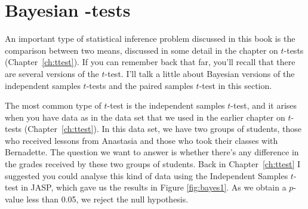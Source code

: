 \begin{comment}
Finally, if we turn to hypergeometric sampling in which everything is fixed, we get...
\begin{rblock1}
> @usr{contingencyTableBF(crosstab, sampleType = "hypergeom")}
Error in contingencyHypergeometric(as.matrix(data2), a) : 
  hypergeometric contingency tables restricted to 2 x 2 tables; see help for contingencyTableBF()
\end{rblock1}
... an error message. Okay, some quick reading through the help files hints that support for larger contingency tables is coming, but it's not been implemented yet. In the meantime, let's imagine we have data from the ``toy labelling'' experiment I described earlier in this section. Specifically, let's say our data look like this:
\begin{rblock1}
> @usr{toys}
     pink blue
girl    8    2
boy     2    8
\end{rblock1}
The Bayesian test with hypergeometric sampling gives us this:
\begin{rblock1}
> @usr{contingencyTableBF(toys, sampleType = "hypergeom")}
Bayes factor analysis
--------------
[1] Non-indep. (a=1) : 8.294321 @plusorminus0%

Against denominator:
  Null, independence, a = 1 
---
Bayes factor type: BFcontingencyTable, hypergeometric
\end{rblock1}
The Bayes factor of 8:1 provides modest evidence that the labels were being assigned in a way that correlates gender with colour, but it's not conclusive.



\end{comment}


\section{Bayesian \texorpdfstring{}{}-tests\label{sec:ttestbf}}

An important type of statistical inference problem discussed in this book is the comparison between two means, discussed in some detail in the chapter on $t$-tests (Chapter~\ref{ch:ttest}). If you can remember back that far, you'll recall that there are several versions of the $t$-test. I'll talk a little about Bayesian versions of the independent samples $t$-tests and the paired samples $t$-test in this section. 


The most common type of $t$-test is the independent samples $t$-test, and it arises when you have data as in the  data set that we used in the earlier chapter on $t$-tests (Chapter~\ref{ch:ttest}). In this data set, we have two groups of students, those who received lessons from Anastasia and those who took their classes with Bernadette. The question we want to answer is whether there's any difference in the grades received by these two groups of students. Back in Chapter~\ref{ch:ttest} I suggested you could analyse this kind of data using the Independent Samples $t$-test in JASP, which gave us the results in Figure \ref{fig:bayes1}. As we obtain a $p$-value less than 0.05, we reject the null hypothesis. 

